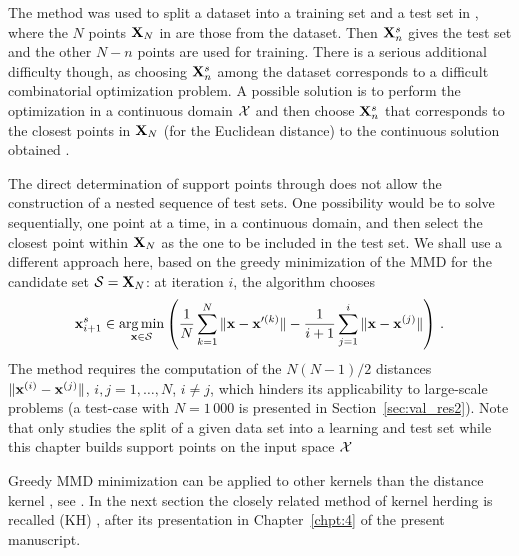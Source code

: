 The method was used to split a dataset into a training set and a test set in \citet{josvak21}, where the $N$ points ${\bf X}_N$ in  are those from the dataset.
Then ${\bf X}_n^s$ gives the test set and the other $N-n$ points are used for training. 
There is a serious additional difficulty though, as choosing ${\bf X}_n^s$ among the dataset corresponds to a difficult combinatorial optimization problem. 
A possible solution is to perform the optimization in a continuous domain $\mathcal{X}$ and then choose ${\bf X}_n^s$ that corresponds to the closest points in ${\bf X}_N$ (for the Euclidean distance) to the continuous solution obtained \cite{josvak21}. 

The direct determination of support points through  does not allow the construction of a nested sequence of test sets. 
One possibility would be to solve  sequentially, one point at a time, in a continuous domain, and then select the closest point within ${\bf X}_N$ as the one to be included in the test set. 
We shall use a different approach here, based on the greedy minimization of the MMD  for the candidate set $\mathcal{S}={\bf X}_N$: at iteration $i$, the algorithm chooses
\begin{equation}\label{eq:GreedySP}
{\bf x}_{i+1}^s \in \operatorname*{arg\,min}_{{\bf x}\in\mathcal{S}} \left( \frac{1}{N} \sum_{k=1}^N \|{\bf x}-{\bf x}'^{(k)}\| - \frac{1}{i+1} \sum_{j=1}^{i} \|{\bf x}-{\bf x}^{(j)}\| \right) \,.
\end{equation}
The method requires the computation of the $N(N-1)/2$ distances $\|{\bf x}^{(i)}-{\bf x}^{(j)}\|$, $i,j=1,\ldots,N$, $i\neq j$, which hinders its applicability to large-scale problems (a test-case with $N=1\,000$ is presented in Section~\ref{sec:val_res2}). 
Note that \cite{josvak21} only studies the split of a given data set into a learning and test set while this chapter builds support points on the input space $\mathcal{X}$

Greedy MMD minimization can be applied to other kernels than the distance kernel , see \cite{teymur_gorham_2021,pronzato_2021}. 
In the next section the closely related method of kernel herding is recalled (KH) \citep{chen_welling_2010}, after its presentation in Chapter~\ref{chpt:4} of the present manuscript.

